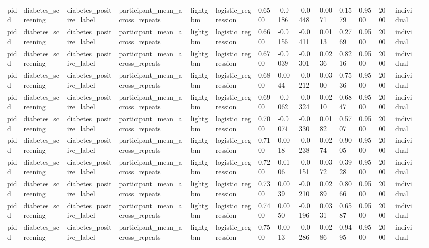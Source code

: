 \begin{tabular}{lllllllllllllll}
pidd & diabetes\_screening & diabetes\_positive\_label & participant\_mean\_across\_repeats & lightgbm & logistic\_regression & 0.6500 & -0.0186 & -0.0448 & 0.0071 & 0.1579 & 0.9500 & 2000 & individual &  \\
pidd & diabetes\_screening & diabetes\_positive\_label & participant\_mean\_across\_repeats & lightgbm & logistic\_regression & 0.6600 & -0.0155 & -0.0411 & 0.0113 & 0.2769 & 0.9500 & 2000 & individual &  \\
pidd & diabetes\_screening & diabetes\_positive\_label & participant\_mean\_across\_repeats & lightgbm & logistic\_regression & 0.6700 & -0.0039 & -0.0301 & 0.0236 & 0.8216 & 0.9500 & 2000 & individual &  \\
pidd & diabetes\_screening & diabetes\_positive\_label & participant\_mean\_across\_repeats & lightgbm & logistic\_regression & 0.6800 & 0.0044 & -0.0212 & 0.0300 & 0.7536 & 0.9500 & 2000 & individual &  \\
pidd & diabetes\_screening & diabetes\_positive\_label & participant\_mean\_across\_repeats & lightgbm & logistic\_regression & 0.6900 & -0.0062 & -0.0324 & 0.0210 & 0.6847 & 0.9500 & 2000 & individual &  \\
pidd & diabetes\_screening & diabetes\_positive\_label & participant\_mean\_across\_repeats & lightgbm & logistic\_regression & 0.7000 & -0.0074 & -0.0330 & 0.0182 & 0.5707 & 0.9500 & 2000 & individual &  \\
pidd & diabetes\_screening & diabetes\_positive\_label & participant\_mean\_across\_repeats & lightgbm & logistic\_regression & 0.7100 & 0.0018 & -0.0238 & 0.0274 & 0.9005 & 0.9500 & 2000 & individual &  \\
pidd & diabetes\_screening & diabetes\_positive\_label & participant\_mean\_across\_repeats & lightgbm & logistic\_regression & 0.7200 & 0.0106 & -0.0151 & 0.0372 & 0.3928 & 0.9500 & 2000 & individual &  \\
pidd & diabetes\_screening & diabetes\_positive\_label & participant\_mean\_across\_repeats & lightgbm & logistic\_regression & 0.7300 & 0.0039 & -0.0210 & 0.0289 & 0.8066 & 0.9500 & 2000 & individual &  \\
pidd & diabetes\_screening & diabetes\_positive\_label & participant\_mean\_across\_repeats & lightgbm & logistic\_regression & 0.7400 & 0.0050 & -0.0196 & 0.0331 & 0.6587 & 0.9500 & 2000 & individual &  \\
pidd & diabetes\_screening & diabetes\_positive\_label & participant\_mean\_across\_repeats & lightgbm & logistic\_regression & 0.7500 & 0.0013 & -0.0286 & 0.0286 & 0.9495 & 0.9500 & 2000 & individual &  \\

\end{tabular}
